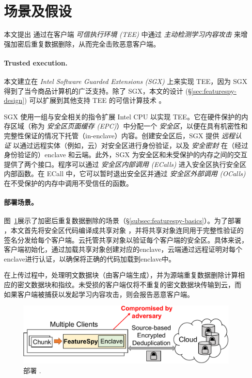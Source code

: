 \section{场景及假设}
\label{sec:featurespy-setting}
本文提出 \sysnameF 通过在客户端 {\em 可信执行环境 (TEE)} 中通过 {\em 主动检测学习内容攻击} 来增强加密后重复数据删除，从而完全击败恶意客户端。

\paragraph*{Trusted execution.} 本文建立在 {\em Intel Software Guarded Extensions (SGX)} \cite{sgx} 上来实现 TEE，因为 SGX 得到了当今商品计算机的广泛支持。除了 SGX，本文的设计 (\S\ref{sec:featurespy-design}) 可以扩展到其他支持 TEE 的可信计算技术 \cite{AMDSEV, pinto19}。

SGX 使用一组与安全相关的指令扩展 Intel CPU 以实现 TEE。它在硬件保护的内存区域（称为 {\em 安全区页面缓存 (EPC)}）中分配一个 {\em 安全区}，以便在具有机密性和完整性保证的情况下托管（in-enclave）内容。创建安全区后，SGX 提供 {\em 远程认证} 以通过远程实体（例如，云）对安全区进行身份验证，以及 {\em 安全密封} 在（经过身份验证的）enclave 和云端。此外，SGX 为安全区和未受保护的内存之间的交互提供了两个接口。程序可以通过 {\em 安全区内部调用 (ECalls)} 进入安全区执行安全区内部函数。在 ECall 中，它可以暂时退出安全区并通过 {\em 安全区外部调用 (OCalls)} 在不受保护的内存中调用不受信任的函数。



\paragraph*{部署场景。}图~\ref{fig:featurespy-model}展示了加密后重复数据删除的场景（\S\ref{subsec:featurespy-basics}）。为了部署 \sysnameF，本文首先将安全区代码编译成共享对象 \cite{sgx}，并将共享对象连同用于完整性验证的签名分发给每个客户端。云托管共享对象以验证每个客户端的安全区。具体来说，客户端初始化\sysnameF，通过加载共享对象创建对应的enclave，云端通过远程证明\cite{sgx}对每个enclave进行认证，以确保将正确的代码加载到enclave中。

在上传过程中，\sysnameF 处理明文数据块（由客户端生成），并为源端重复数据删除计算相应的密文数据块和指纹。未受损的客户端仅将不重复的密文数据块传输到云，而 \sysnameF 如果客户端被捕获以发起学习内容攻击，则会报告恶意客户端。

\begin{figure}
    \centering
    \includegraphics[width=\textwidth]{pic/featurespy/deployment.pdf}
    \vspace{-6pt}
    \caption{部署 \sysnameF.}
    \label{fig:featurespy-model}
    \vspace{-6pt}
\end{figure}

